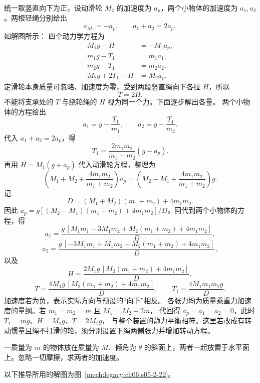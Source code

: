 {\begin{xesolution}
统一取竖直向下为正，设动滑轮 $M_2$ 的加速度为 $a_p$，两个小物体的加速度为
$a_1,a_2$。两根轻绳分别给出
\[
 a_{M_1}=-a_p,
 \qquad
 a_1+a_2=2a_p,
\]
如解图所示：
\soldiagTwoTwentyOne
四个动力学方程为
\begin{align*}
 M_1g-H&=-M_1a_p,\\
 m_1g-T_1&=m_1a_1,\\
 m_2g-T_1&=m_2a_2,\\
 M_2g+2T_1-H&=M_2a_p.
\end{align*}
定滑轮本身质量可忽略、加速度为零，受到两段竖直绳向下各拉 $H$，所以
\[
 \boxed{T=2H}.
\]
不能将支承处的 $T$ 与绕轮绳的 $H$ 视为同一个力。下面逐步解出各量。
两个小物体的方程给出
\[
 a_1=g-\frac{T_1}{m_1},\qquad a_2=g-\frac{T_1}{m_2}.
\]
代入 $a_1+a_2=2a_p$，得
\[
 T_1=\frac{2m_1m_2}{m_1+m_2}(g-a_p).
\]
再用 $H=M_1(g+a_p)$ 代入动滑轮方程，整理为
\[
 \left(M_1+M_2+\frac{4m_1m_2}{m_1+m_2}\right)a_p
 =\left(M_2-M_1+\frac{4m_1m_2}{m_1+m_2}\right)g.
\]
记
\[
 D=(M_1+M_2)(m_1+m_2)+4m_1m_2.
\]
因此 $a_p=g[(M_2-M_1)(m_1+m_2)+4m_1m_2]/D$。回代到两个小物体的方程，得
\[
 \boxed{a_1=
 \frac{g\,[M_1m_1-3M_1m_2+M_2(m_1+m_2)+4m_1m_2]}{D}},
\]
\[
 \boxed{a_2=
 \frac{g\,[-3M_1m_1+M_1m_2+M_2(m_1+m_2)+4m_1m_2]}{D}},
\]
以及
\[
 \boxed{H=\frac{2M_1g\,[M_2(m_1+m_2)+4m_1m_2]}{D}},
\]
\[
 \boxed{T=\frac{4M_1g\,[M_2(m_1+m_2)+4m_1m_2]}{D}},\qquad
 \boxed{T_1=\frac{4M_1m_1m_2g}{D}}.
\]
加速度若为负，表示实际方向与预设的“向下”相反。
各张力均为质量乘重力加速度的量纲。若 $m_1=m_2=m$ 且 $M_1=M_2+2m$，
代回得 $a_p=a_1=a_2=0$，此时 $T_1=mg$、$H=M_1g$、$T=2M_1g$，
与整个装置的静力平衡相符。这里若改成有转动惯量且绳不打滑的轮，须分别设置下绳两侧张力并增加转动方程。
\end{xesolution}

\begin{origexamplebox}{}\label{ch06:ex:s05-2-22}
一质量为 $m$ 的物体放在质量为 $M$、倾角为 $\theta$ 的斜面上，两者一起放置于水平面
上。忽略一切摩擦，求两者的加速度。
\probdiagTwoTwentyTwo
\end{origexamplebox}

\begin{xesolution}
以下推导所用的解图为图~\ref{mech:legacy:ch06:s05-2-22}。


\end{xesolution}}
